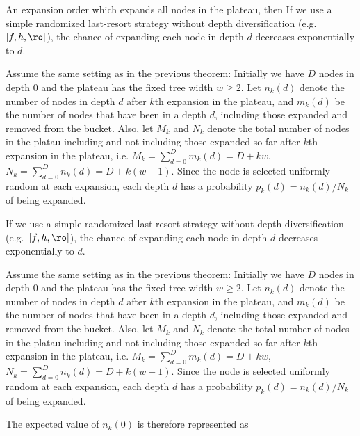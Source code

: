

\begin{theo}
 An expansion order which expands all nodes in the plateau, then 
 If we use a simple randomized last-resort strategy
 without depth diversification (e.g.\ $[f,h,\ro]$), the chance of expanding each
 node in depth $d$ decreases exponentially to $d$.
\end{theo}

Assume the same setting as in the previous theorem: Initially we have
$D$ nodes in depth 0 and the plateau has the fixed tree width $w\geq 2$.
Let $n_k(d)$ denote the number of nodes in depth $d$ after $k$th
expansion in the plateau, and
$m_k(d)$ be the number of nodes that have been in a depth $d$, including
those expanded and removed from the bucket.
Also, let $M_k$ and $N_k$ denote the total number of nodes in the platau
including and not including those expanded so far after $k$th
expansion in the plateau, i.e. $M_k=\sum_{d=0}^{D}m_k(d)=D+kw$, $N_k=\sum_{d=0}^{D}n_k(d)=D+k(w-1)$.
Since the node is
selected uniformly random at each expansion, each depth $d$ has a
probability $p_k(d) = n_k(d)/N_k$ of being expanded.


\begin{theo}
 If we use a simple randomized last-resort strategy
 without depth diversification (e.g.\ $[f,h,\ro]$), the chance of expanding each
 node in depth $d$ decreases exponentially to $d$.
\end{theo}

Assume the same setting as in the previous theorem: Initially we have
$D$ nodes in depth 0 and the plateau has the fixed tree width $w\geq 2$.
Let $n_k(d)$ denote the number of nodes in depth $d$ after $k$th
expansion in the plateau, and
$m_k(d)$ be the number of nodes that have been in a depth $d$, including
those expanded and removed from the bucket.
Also, let $M_k$ and $N_k$ denote the total number of nodes in the platau
including and not including those expanded so far after $k$th
expansion in the plateau, i.e. $M_k=\sum_{d=0}^{D}m_k(d)=D+kw$, $N_k=\sum_{d=0}^{D}n_k(d)=D+k(w-1)$.
Since the node is
selected uniformly random at each expansion, each depth $d$ has a
probability $p_k(d) = n_k(d)/N_k$ of being expanded.



The expected value of $n_k(0)$ is therefore represented as

